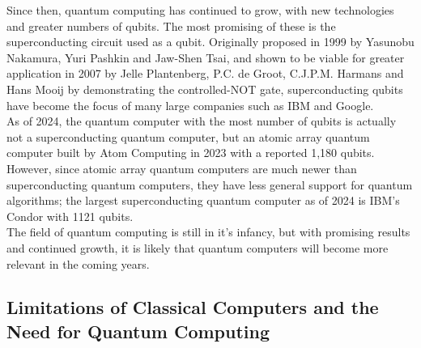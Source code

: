 \documentclass{amsart}
\numberwithin{equation}{section}
\begin{document}
\begin{justify}
Since then, quantum computing has continued to grow, with new technologies and greater numbers of qubits. The most promising of these is the superconducting circuit used as a qubit. Originally proposed in 1999 by Yasunobu Nakamura, Yuri Pashkin and Jaw-Shen Tsai, \cite{NakamuraPashkinTsai1999} and shown to be viable for greater application in 2007 by Jelle Plantenberg, P.C. de Groot, C.J.P.M. Harmans and Hans Mooij by demonstrating the controlled-NOT gate, \cite{PlantenbergGrootHarmansMooij2007} superconducting qubits have become the focus of many large companies such as IBM and Google. \\

As of 2024, the quantum computer with the most number of qubits is actually not a superconducting quantum computer, but an atomic array quantum computer built by Atom Computing in 2023 \cite{Atom2023, Atom2024} with a reported 1,180 qubits. However, since atomic array quantum computers are much newer than superconducting quantum computers, they have less general support for quantum algorithms; the largest superconducting quantum computer as of 2024 is IBM's Condor with 1121 qubits. \cite{IBM2023, AbuGhanem2024} \\

The field of quantum computing is still in it's infancy, but with promising results and continued growth, it is likely that quantum computers will become more relevant in the coming years.
\end{justify}

\subsection{Limitations of Classical Computers and the Need for Quantum Computing}
\end{document}
